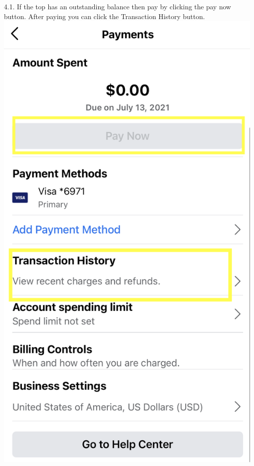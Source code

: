 \documentclass[]{book}
\begin{document}
4.1. If the top has an outstanding balance then pay by clicking the pay now button. After paying you can click the Transaction History button.
\includegraphics{images/lab_protocols/ig_pay/ig_7.png}
\end{document}
